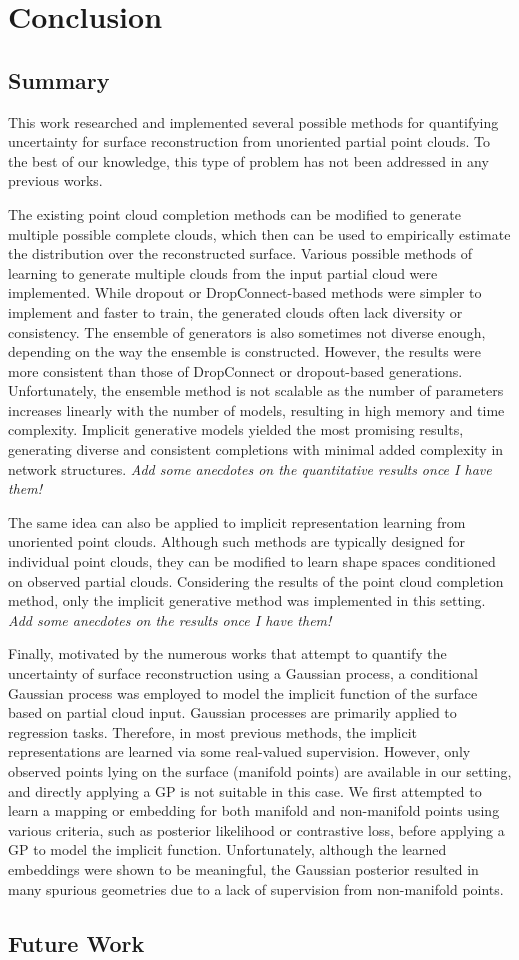 \chapter{Conclusion}\label{ch:conclusion}
\section{Summary}
This work researched and implemented several possible methods for quantifying uncertainty for surface reconstruction from unoriented partial point clouds. To the best of our knowledge, this type of problem has not been addressed in any previous works. 

The existing point cloud completion methods can be modified to generate multiple possible complete clouds, which then can be used to empirically estimate the distribution over the reconstructed surface. Various possible methods of learning to generate multiple clouds from the input partial cloud were implemented. While dropout or DropConnect-based methods were simpler to implement and faster to train, the generated clouds often lack diversity or consistency. The ensemble of generators is also sometimes not diverse enough, depending on the way the ensemble is constructed. However, the results were more consistent than those of DropConnect or dropout-based generations. Unfortunately, the ensemble method is not scalable as the number of parameters increases linearly with the number of models, resulting in high memory and time complexity. Implicit generative models yielded the most promising results, generating diverse and consistent completions with minimal added complexity in network structures.
\textit{\color{orange} Add some anecdotes on the quantitative results once I have them!}

The same idea can also be applied to implicit representation learning from unoriented point clouds. Although such methods are typically designed for individual point clouds, they can be modified to learn shape spaces conditioned on observed partial clouds. Considering the results of the point cloud completion method, only the implicit generative method was implemented in this setting. \textit{\color{orange} Add some anecdotes on the results once I have them!} 

Finally, motivated by the numerous works that attempt to quantify the uncertainty of surface reconstruction using a Gaussian process, a conditional Gaussian process was employed to model the implicit function of the surface based on partial cloud input. Gaussian processes are primarily applied to regression tasks. Therefore, in most previous methods, the implicit representations are learned via some real-valued supervision. However, only observed points lying on the surface (manifold points) are available in our setting, and directly applying a GP is not suitable in this case. We first attempted to learn a mapping or embedding for both manifold and non-manifold points using various criteria, such as posterior likelihood or contrastive loss, before applying a GP to model the implicit function. Unfortunately, although the learned embeddings were shown to be meaningful, the Gaussian posterior resulted in many spurious geometries due to a lack of supervision from non-manifold points.



\section{Future Work}